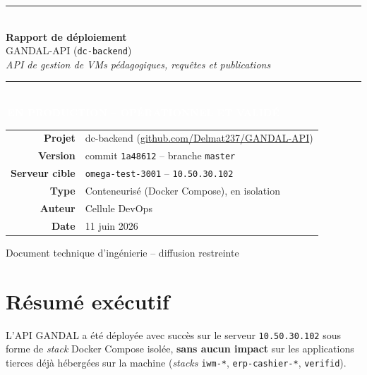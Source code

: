 \documentclass[11pt,a4paper]{article}
\newcommand{\code}[1]{\texttt{\small #1}}
\newcommand{\statusbadge}[2]{\colorbox{#1}{\textcolor{white}{\textbf{\,#2\,}}}}
\begin{document}
\begin{titlepage}
\centering
\vspace*{1.5cm}

{\color{rule}\rule{\linewidth}{1.2pt}}\\[0.6cm]
{\color{primary}\Huge\bfseries Rapport de déploiement}\\[0.45cm]
{\LARGE GANDAL-API \textnormal{(\code{dc-backend})}}\\[0.35cm]
{\large\itshape API de gestion de VMs pédagogiques, requêtes et publications}\\[0.5cm]
{\color{rule}\rule{\linewidth}{1.2pt}}\\[1.2cm]

\statusbadge{ok}{EN PRODUCTION -- OPÉRATIONNEL ET VALIDÉ}\\[1.6cm]

\begin{tabular}{@{}r l@{}}
\textbf{Projet} & dc-backend (\href{https://github.com/Delmat237/GANDAL-API}{github.com/Delmat237/GANDAL-API})\\
\textbf{Version} & commit \code{1a48612} -- branche \code{master}\\
\textbf{Serveur cible} & \code{omega-test-3001} -- \code{10.50.30.102}\\
\textbf{Type} & Conteneurisé (Docker Compose), en isolation\\
\textbf{Auteur} & Cellule DevOps\\
\textbf{Date} & 11 juin 2026\\
\end{tabular}

\vfill
{\small\color{primary}Document technique d'ingénierie -- diffusion restreinte}
\end{titlepage}

\tableofcontents
\thispagestyle{fancy}
\newpage

\section{Résumé exécutif}

L'API GANDAL a été déployée avec succès sur le serveur \code{10.50.30.102} sous forme
de \emph{stack} Docker Compose isolée, \textbf{sans aucun impact} sur les applications
tierces déjà hébergées sur la machine (\emph{stacks} \code{iwm-*}, \code{erp-cashier-*},
\code{verifid}).
\end{document}
